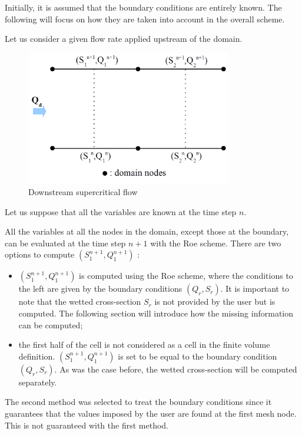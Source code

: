 Initially, it is assumed that the boundary conditions are entirely known. The following will focus on how they are taken into account in the overall scheme.

Let us consider a given flow rate applied upstream of the domain.

\begin{figure}[H]
 \begin{center}
  \includegraphics[width=0.8\textwidth]{Figures/NDomaine.png}
  \caption{Downstream supercritical flow}
 \end{center}
\end{figure}

Let us suppose that all the variables are known at the time step $n$.

All the variables at all the nodes in the domain, except those at the boundary, can be evaluated at the time step $n+1$ with the Roe scheme. There are two options to compute $(S_{1}^{n+1},Q_{1}^{n+1})$ :
\begin{itemize}
 \item $(S_{1}^{n+1},Q_{1}^{n+1})$ is computed using the Roe scheme, where the conditions to the left are given by the boundary conditions $(Q_r,S_r)$. It is important to note that the wetted cross-section $S_r$ is not provided by the user but is computed. The following section will introduce how the missing information can be computed;
 \item the first half of the cell is not considered as a cell in the finite volume definition. $(S_{1}^{n+1},Q_{1}^{n+1})$ is set to be equal to the boundary condition $(Q_r,S_r)$. As was the case before, the wetted cross-section will be computed separately.
\end{itemize}

The second method was selected to treat the boundary conditions since it guarantees that the values imposed by the user are found at the first mesh node. This is not guaranteed with the first method.

